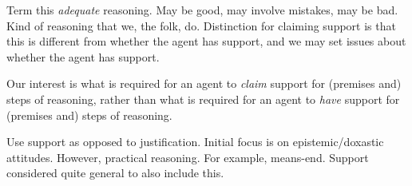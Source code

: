\begin{note}
  Term this \emph{adequate} reasoning.
  May be good, may involve mistakes, may be bad.
  Kind of reasoning that we, the folk, do.
  Distinction for claiming support is that this is different from whether the agent has support, and we may set issues about whether the agent has support.

  Our interest is what is required for an agent to \emph{claim} support for (premises and) steps of reasoning, rather than what is required for an agent to \emph{have} support for (premises and) steps of reasoning.

  Use support as opposed to justification.
  Initial focus is on epistemic/doxastic attitudes.
  However, practical reasoning.
  For example, means-end.
  Support considered quite general to also include this.
\end{note}

